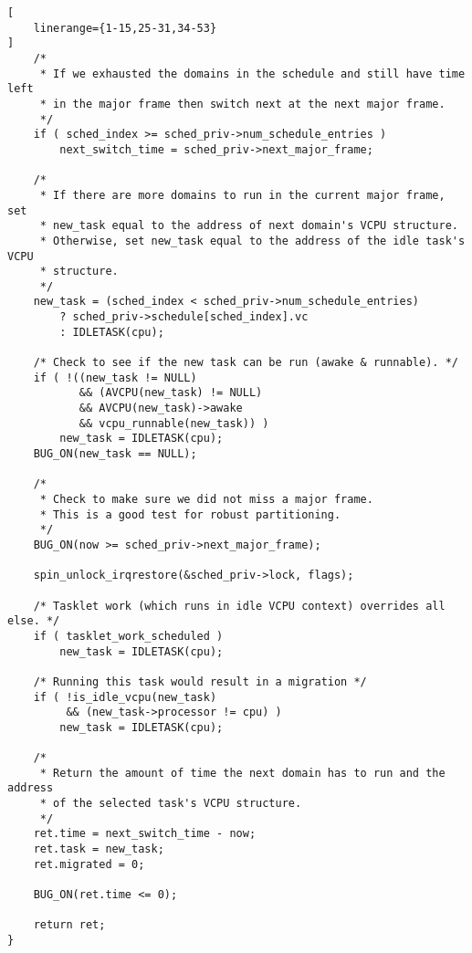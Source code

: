 \begin{appendices}
\begin{lstlisting}[
	linerange={1-15,25-31,34-53}
]
    /*
     * If we exhausted the domains in the schedule and still have time left
     * in the major frame then switch next at the next major frame.
     */
    if ( sched_index >= sched_priv->num_schedule_entries )
        next_switch_time = sched_priv->next_major_frame;

    /*
     * If there are more domains to run in the current major frame, set
     * new_task equal to the address of next domain's VCPU structure.
     * Otherwise, set new_task equal to the address of the idle task's VCPU
     * structure.
     */
    new_task = (sched_index < sched_priv->num_schedule_entries)
        ? sched_priv->schedule[sched_index].vc
        : IDLETASK(cpu);

    /* Check to see if the new task can be run (awake & runnable). */
    if ( !((new_task != NULL)
           && (AVCPU(new_task) != NULL)
           && AVCPU(new_task)->awake
           && vcpu_runnable(new_task)) )
        new_task = IDLETASK(cpu);
    BUG_ON(new_task == NULL);

    /*
     * Check to make sure we did not miss a major frame.
     * This is a good test for robust partitioning.
     */
    BUG_ON(now >= sched_priv->next_major_frame);

    spin_unlock_irqrestore(&sched_priv->lock, flags);

    /* Tasklet work (which runs in idle VCPU context) overrides all else. */
    if ( tasklet_work_scheduled )
        new_task = IDLETASK(cpu);

    /* Running this task would result in a migration */
    if ( !is_idle_vcpu(new_task)
         && (new_task->processor != cpu) )
        new_task = IDLETASK(cpu);

    /*
     * Return the amount of time the next domain has to run and the address
     * of the selected task's VCPU structure.
     */
    ret.time = next_switch_time - now;
    ret.task = new_task;
    ret.migrated = 0;

    BUG_ON(ret.time <= 0);

    return ret;
}
\end{lstlisting}
\end{appendices}
